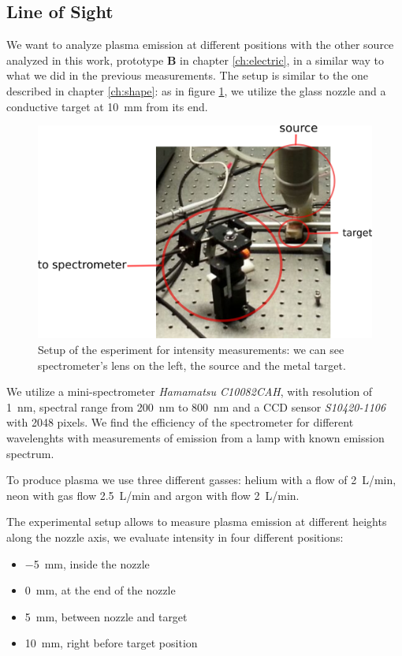 \subsection{Line of Sight}
We want to analyze plasma emission at different positions with the other source analyzed in this work, prototype \textbf{B} in chapter \ref{ch:electric}, in a similar way to what we did in the previous measurements. The setup is similar to the one described in chapter \ref{ch:shape}: as in figure \ref{fig:app2}, we utilize the glass nozzle and a conductive target at \SI{10}{\milli\meter} from its end.
\begin{figure}
\centering
\includegraphics[width=.7\textwidth]{Images/Spectroscopy/app2_lines.png}
\caption{Setup of the esperiment for intensity measurements: we can see spectrometer's lens on the left, the source and the metal target.}
\label{fig:app2}
\end{figure}

We utilize a mini-spectrometer \emph{Hamamatsu C10082CAH}, with resolution of \SI{1}{\nano\meter}, spectral range from \SI{200}{\nano\meter} to \SI{800}{\nano\meter} and a CCD sensor \emph{S10420-1106} with \num{2048} pixels. We find the efficiency of the spectrometer for different wavelenghts with measurements of emission from a lamp with known emission spectrum.

To produce plasma we use three different gasses: helium with a flow of \SI{2}{\liter/\minute}, neon with gas flow \SI{2.5}{\liter/\minute} and argon with flow \SI{2}{\liter/\minute}.

The experimental setup allows to measure plasma emission at different heights along the nozzle axis, we evaluate intensity in four different positions:
\begin{itemize}
 \item \SI{-5}{\milli\meter}, inside the nozzle
 \item \SI{0}{\milli\meter}, at the end of the nozzle
 \item \SI{5}{\milli\meter}, between nozzle and target
 \item \SI{10}{\milli\meter}, right before target position
\end{itemize}

